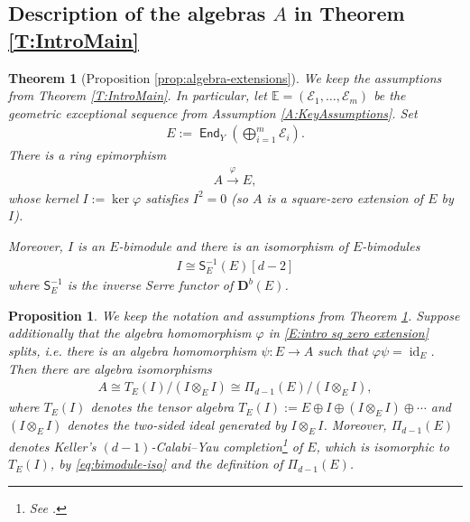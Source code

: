 \documentclass[a4paper,11pt, reqno]{amsart}
\def\DD{\mathbf D}
\def\sE{\mathscr{E}}
\def\id{{\operatorname{id}}}
\newcommand{\opname}[1]{\operatorname{\mathsf{#1}}}
\newcommand{\End}{\opname{End}}
\def\Db{\DD^b}
\newcommand{\bS}{\mathsf{S}}
\theoremstyle{plain}
\newtheorem{theorem}[dummy]{Theorem}
\newtheorem{proposition}[dummy]{Proposition}
\theoremstyle{definition}
\numberwithin{equation}{section}
\newlength{\arrow}
\begin{document}
\subsection{Description of the algebras $A$ in Theorem \ref{T:IntroMain}}\label{subsec:descriptionIntro}



\begin{theorem}[Proposition \ref{prop:algebra-extensions}]\label{T:Algebras}
We keep the assumptions from Theorem \ref{T:IntroMain}. In particular, let $\mathbb{E} = ( \sE_1, \ldots, \sE_m )$ be the geometric exceptional sequence from Assumption \ref{A:KeyAssumptions}. Set
\begin{align}
E:=\End_Y\left(\bigoplus_{i=1}^m \sE_i\right).
\end{align} 
There is a ring epimorphism
\begin{align} \label{E:intro sq zero extension}
A \xrightarrow{\varphi} E,
\end{align}
whose kernel $I:=\ker \varphi$ satisfies $I^2=0$ (so $A$ is a \emph{square-zero extension} of $E$ by $I$).

Moreover, $I$ is an $E$-bimodule and there is an isomorphism of $E$-bimodules
\begin{align}\label{eq:bimodule-iso}
    I \cong \bS^{-1}_E(E)[d-2]
\end{align}
where $\bS^{-1}_E$ is the inverse Serre functor of $\Db(E)$.
\end{theorem}


\begin{proposition} \label{T:IntroSplit}
    We keep the notation and assumptions from Theorem \ref{T:Algebras}. Suppose additionally that the algebra homomorphism $\varphi$ in \eqref{E:intro sq zero extension} splits, i.e. there is an algebra homomorphism $\psi\colon E \to A$ such that $\varphi \psi =\id_E$. Then  there are algebra isomorphisms
\begin{align}\label{eq:introAquotientalgebra}
A \cong T_E(I)/(I \otimes_E I) \cong \Pi_{d-1}(E)/(I \otimes_E I),    
\end{align}
where $T_E(I)$ denotes the tensor algebra $T_E(I):=E \oplus I  \oplus (I \otimes_E I) \oplus \cdots$ and $(I \otimes_E I)$ denotes the two-sided ideal generated by $I \otimes_E I$. Moreover, $\Pi_{d-1}(E)$ denotes Keller's  $(d-1)$-Calabi--Yau completion\footnote{See \cite[Section 4]{KellerCY}.} of $E$, which is isomorphic to $T_E(I)$, by \eqref{eq:bimodule-iso} and the definition of $\Pi_{d-1}(E)$. 
\end{proposition}
\end{document}
